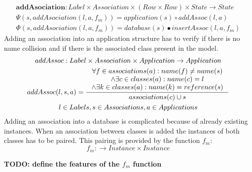 \documentclass[11pt]{article}
\begin{document}
\begin{gather*}
\mathbf{addAsociation} : Label \times Association \times (Row \times Row) \times State \rightarrow State \\
\Psi(s, addAsociation(l, a, f_m)) = application(s) \circ addAssoc(l, a) \\
\Phi(s, addAsociation(l, a, f_m)) = database(s) \bullet insertAssoc(l, a, f_m)
\end{gather*}
Adding an association into an application structure has to verify if there is no name collision and if there is the associated class present in the model.
\begin{gather*}
addAssoc : Label \times Association \times Application \rightarrow Application \\
addAssoc(l, s, a) = \inference{\forall f \in associations(a) : name(f) \neq name(s) \\ \wedge \exists c \in classes(a) : name(c) = l \\ \wedge \exists k \in classes(a) : name(k) = reference(s) }{associations(c) \cup s}\\
l \in Labels, s \in Associations, a \in Applications
\end{gather*}
Adding an association into a database is complicated because of already existing instances. When an association between classes is added the instances of both classes has to be paired. This pairing is provided by the function $f_m$:
$$f_m : \rightarrow Instance \times Instance $$

\textbf{TODO: define the features of the $f_m$ function}
\end{document}

